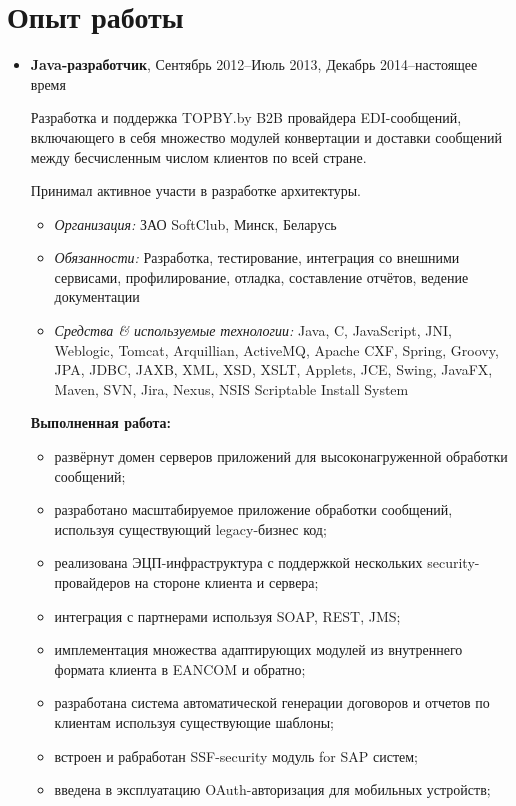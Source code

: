 \documentclass[a4paper, 12pt]{article}
\newcommand{\position}[1]{
    \textbf{#1}}
\newcommand{\itemlabel}[1]{
    \textit{#1:}}
\begin{document}
\section*{Опыт работы}

    \begin{itemize}
        \item \position{Java-разработчик}, Сентябрь 2012--Июль 2013, Декабрь 2014--настоящее время

            Разработка и поддержка TOPBY.by B2B провайдера EDI-сообщений, включающего в себя множество модулей конвертации и доставки сообщений  между бесчисленным числом клиентов по всей стране.

            Принимал активное участи в разработке архитектуры.
            	
            \begin{itemize}
                \item \itemlabel{Организация} ЗАО SoftClub, Минск, Беларусь
                \item \itemlabel{Обязанности} Разработка, тестирование, интеграция со внешними сервисами, 
                \newline профилирование, отладка, составление отчётов, ведение документации
                \item \itemlabel{Средства \& используемые технологии} Java, C, JavaScript, JNI, Weblogic, Tomcat, Arquillian, ActiveMQ, Apache CXF, Spring, Groovy, JPA, JDBC, JAXB, XML, XSD, XSLT, Applets, JCE, Swing, JavaFX, Maven, SVN, Jira, Nexus, NSIS Scriptable Install System
            \end{itemize}
            
            \textbf{Выполненная работа:}
			\begin{itemize}
  				\item развёрнут домен серверов приложений для высоконагруженной обработки сообщений;
  				\item разработано масштабируемое приложение обработки сообщений, используя существующий legacy-бизнес код;
				\item реализована ЭЦП-инфраструктура с поддержкой нескольких security-провайдеров на стороне клиента и сервера;
  				\item интеграция с партнерами используя SOAP, REST, JMS;
  				\item имплементация множества адаптирующих модулей из внутреннего формата клиента в EANCOM и обратно;
  				\item разработана система автоматической генерации договоров и отчетов по клиентам используя существующие шаблоны;
  				\item встроен и рабработан SSF-security модуль for SAP систем;
  				\item введена в эксплуатацию OAuth-авторизация для мобильных устройств;
			\end{itemize}
            

\end{itemize}
\end{document}
